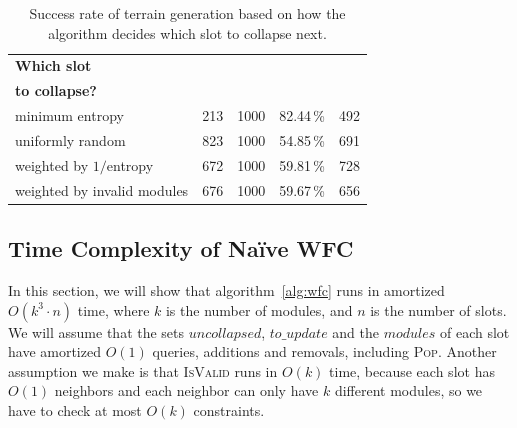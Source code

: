 \begin{table}[H]
    \centering
    \begin{tabular}{lrrD{.}{.}{-1}r}
        \toprule
        \textbf{Which slot}         &                          &                              & \mc{}                                &                             \\
        \textbf{to collapse?}       &  &  &  &  \\
        \midrule
        minimum entropy             & 213                      & 1000                         & 82.44\,\%                            & 492                         \\
        uniformly random            & 823                      & 1000                         & 54.85\,\%                            & 691                         \\
        weighted by $1/$entropy     & 672                      & 1000                         & 59.81\,\%                            & 728                         \\
        weighted by invalid modules & 676                      & 1000                         & 59.67\,\%                            & 656                         \\
        \bottomrule
    \end{tabular}
    \caption{Success rate of terrain generation based on how the algorithm decides which slot to collapse next. }
    \label{tab:wfc-collapsing}
\end{table}

\subsection{Time Complexity of Na\"{i}ve WFC}\label{sec:analysis-wfc-time-complexity}

In this section, we will show that algorithm~\ref{alg:wfc} runs in amortized $O(k^3 \cdot n)$ time, where $k$ is the number of modules, and $n$ is the number of slots.
We will assume that the sets $uncollapsed$, $to\_update$ and the $modules$ of each slot have amortized $O(1)$ queries, additions and removals, including \textsc{Pop}.
Another assumption we make is that \textsc{IsValid} runs in $O(k)$ time, because each slot has $O(1)$ neighbors and each neighbor can only have $k$ different modules, so we have to check at most $O(k)$ constraints.

